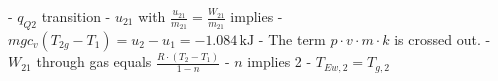 - \( q_{Q2} \) transition
- \( u_{21} \) with \( \frac{u_{21}}{m_{21}} = \frac{W_{21}}{m_{21}} \) implies
- \( m g c_v (T_{2g} - T_1) = u_2 - u_1 = -1.084 \, \text{kJ} \)
- The term \( p \cdot v \cdot m \cdot k \) is crossed out.
- \( W_{21} \) through gas equals \( \frac{R \cdot (T_2 - T_1)}{1 - n} \)
- \( n \) implies 2
- \( T_{Ew,2} = T_{g,2} \)